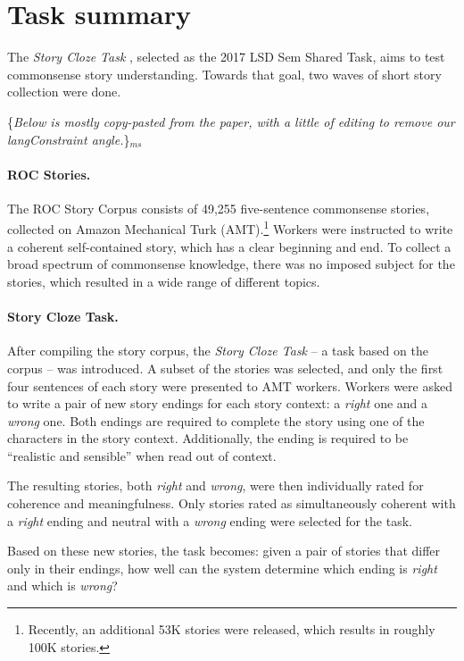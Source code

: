 \documentclass[11pt]{article}
\newcommand{\ms}[1]{{\color{cyan}\{\textit{#1}\}$_{ms}$}}
\begin{document}
\section{Task summary}

The \textit{Story Cloze Task} \cite{Mostafazadeh:2016}, selected as the 2017 LSD Sem Shared Task, aims to test commonsense story understanding. Towards that goal, two waves of short story collection were done.

\ms{Below is mostly copy-pasted from the paper, with a little of editing to remove our langConstraint angle.}
\paragraph{ROC Stories.}
The ROC Story Corpus consists of 49,255 five-sentence commonsense stories, collected on Amazon Mechanical Turk (AMT).\footnote{Recently, an additional 53K stories were released, which results in roughly 100K stories.}
Workers were instructed to write a coherent self-contained story, which has a clear beginning and end. 
To collect a broad spectrum of commonsense knowledge, there was no imposed subject for the stories,
which resulted in a wide range of different topics.
\paragraph{Story Cloze Task.}
After compiling the story corpus, the {\it Story Cloze Task} -- a task based on the corpus -- was introduced.
A subset of the stories was selected, and only the first four sentences of each story were presented to AMT workers.
Workers were asked to write a pair of new story endings for each story context: a {\it right} one and a {\it wrong} one.
Both endings are required to complete the story using one of the characters in the story context. 
Additionally, the ending is required to be ``realistic and sensible'' \cite{Mostafazadeh:2016} when read out of context.

The resulting stories, both {\it right} and {\it wrong}, were then individually rated for coherence and meaningfulness. 
Only stories rated as simultaneously coherent with a {\it right} ending and neutral with a {\it wrong} ending were selected for the task. 

Based on these new stories, the task becomes: given a pair of stories that differ only in their endings, how well can the system determine which ending is {\it right} and which is {\it wrong}?
\end{document}
